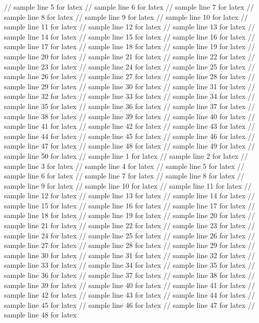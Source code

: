// sample line 5 for latex
// sample line 6 for latex
// sample line 7 for latex
// sample line 8 for latex
// sample line 9 for latex
// sample line 10 for latex
// sample line 11 for latex
// sample line 12 for latex
// sample line 13 for latex
// sample line 14 for latex
// sample line 15 for latex
// sample line 16 for latex
// sample line 17 for latex
// sample line 18 for latex
// sample line 19 for latex
// sample line 20 for latex
// sample line 21 for latex
// sample line 22 for latex
// sample line 23 for latex
// sample line 24 for latex
// sample line 25 for latex
// sample line 26 for latex
// sample line 27 for latex
// sample line 28 for latex
// sample line 29 for latex
// sample line 30 for latex
// sample line 31 for latex
// sample line 32 for latex
// sample line 33 for latex
// sample line 34 for latex
// sample line 35 for latex
// sample line 36 for latex
// sample line 37 for latex
// sample line 38 for latex
// sample line 39 for latex
// sample line 40 for latex
// sample line 41 for latex
// sample line 42 for latex
// sample line 43 for latex
// sample line 44 for latex
// sample line 45 for latex
// sample line 46 for latex
// sample line 47 for latex
// sample line 48 for latex
// sample line 49 for latex
// sample line 50 for latex
// sample line 1 for latex
// sample line 2 for latex
// sample line 3 for latex
// sample line 4 for latex
// sample line 5 for latex
// sample line 6 for latex
// sample line 7 for latex
// sample line 8 for latex
// sample line 9 for latex
// sample line 10 for latex
// sample line 11 for latex
// sample line 12 for latex
// sample line 13 for latex
// sample line 14 for latex
// sample line 15 for latex
// sample line 16 for latex
// sample line 17 for latex
// sample line 18 for latex
// sample line 19 for latex
// sample line 20 for latex
// sample line 21 for latex
// sample line 22 for latex
// sample line 23 for latex
// sample line 24 for latex
// sample line 25 for latex
// sample line 26 for latex
// sample line 27 for latex
// sample line 28 for latex
// sample line 29 for latex
// sample line 30 for latex
// sample line 31 for latex
// sample line 32 for latex
// sample line 33 for latex
// sample line 34 for latex
// sample line 35 for latex
// sample line 36 for latex
// sample line 37 for latex
// sample line 38 for latex
// sample line 39 for latex
// sample line 40 for latex
// sample line 41 for latex
// sample line 42 for latex
// sample line 43 for latex
// sample line 44 for latex
// sample line 45 for latex
// sample line 46 for latex
// sample line 47 for latex
// sample line 48 for latex
